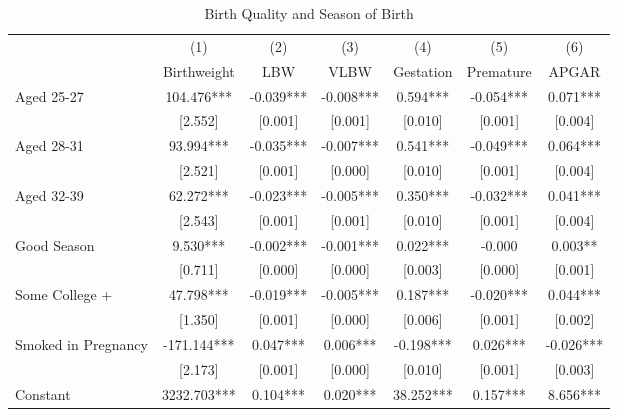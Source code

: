\documentclass[a4paper, 12 pt]{article}
\theoremstyle{plain}
\begin{document}
\begin{doublespace}
\begin{table}[htbp]\centering
\def\sym#1{\ifmmode^{#1}\else\(^{#1}\)\fi}
\caption{Birth Quality and Season of Birth  \label{tab:qualityMain}}
\begin{tabular}{l*{6}{c}}
\toprule
                    &\multicolumn{1}{c}{(1)}   &\multicolumn{1}{c}{(2)}   &\multicolumn{1}{c}{(3)}   &\multicolumn{1}{c}{(4)}   &\multicolumn{1}{c}{(5)}   &\multicolumn{1}{c}{(6)}   \\
                    & Birthweight   &         LBW   &        VLBW   &   Gestation   &   Premature   &       APGAR   \\
\midrule
Aged 25-27          &     104.476***&      -0.039***&      -0.008***&       0.594***&      -0.054***&       0.071***\\
                    &     [2.552]   &     [0.001]   &     [0.001]   &     [0.010]   &     [0.001]   &     [0.004]   \\
Aged 28-31          &      93.994***&      -0.035***&      -0.007***&       0.541***&      -0.049***&       0.064***\\
                    &     [2.521]   &     [0.001]   &     [0.000]   &     [0.010]   &     [0.001]   &     [0.004]   \\
Aged 32-39          &      62.272***&      -0.023***&      -0.005***&       0.350***&      -0.032***&       0.041***\\
                    &     [2.543]   &     [0.001]   &     [0.001]   &     [0.010]   &     [0.001]   &     [0.004]   \\
Good Season         &       9.530***&      -0.002***&      -0.001***&       0.022***&      -0.000   &       0.003** \\
                    &     [0.711]   &     [0.000]   &     [0.000]   &     [0.003]   &     [0.000]   &     [0.001]   \\
Some College +      &      47.798***&      -0.019***&      -0.005***&       0.187***&      -0.020***&       0.044***\\
                    &     [1.350]   &     [0.001]   &     [0.000]   &     [0.006]   &     [0.001]   &     [0.002]   \\
Smoked in Pregnancy &    -171.144***&       0.047***&       0.006***&      -0.198***&       0.026***&      -0.026***\\
                    &     [2.173]   &     [0.001]   &     [0.000]   &     [0.010]   &     [0.001]   &     [0.003]   \\
Constant            &    3232.703***&       0.104***&       0.020***&      38.252***&       0.157***&       8.656***\\

\end{tabular}
\end{table}
\end{doublespace}
\end{document}
